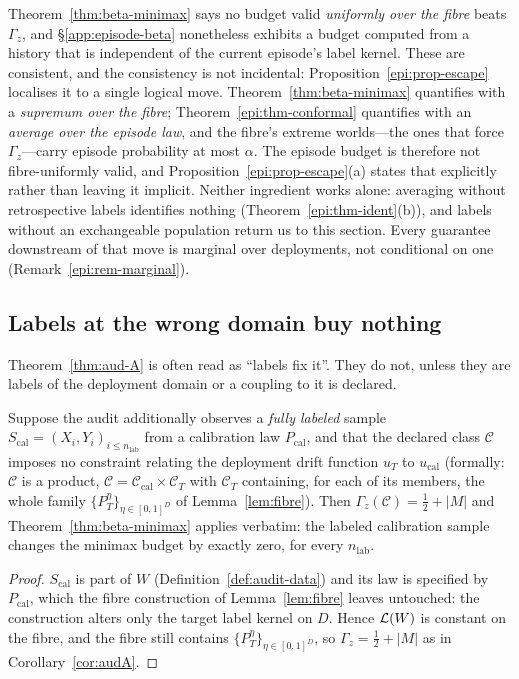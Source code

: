 \begin{remark}\label{rem:seam}
Theorem~\ref{thm:beta-minimax} says no budget valid \emph{uniformly over the fibre} beats
$\Gamma_z$, and \S\ref{app:episode-beta} nonetheless exhibits a budget computed from a history that
is independent of the current episode's label kernel. These are consistent, and the consistency is
not incidental: Proposition~\ref{epi:prop-escape} localises it to a single logical move.
Theorem~\ref{thm:beta-minimax} quantifies with a \emph{supremum over the fibre};
Theorem~\ref{epi:thm-conformal} quantifies with an \emph{average over the episode law}, and the
fibre's extreme worlds---the ones that force $\Gamma_z$---carry episode probability at most
$\alpha$. The episode budget is therefore not fibre-uniformly valid, and
Proposition~\ref{epi:prop-escape}(a) states that explicitly rather than leaving it implicit. Neither
ingredient works alone: averaging without retrospective labels identifies nothing
(Theorem~\ref{epi:thm-ident}(b)), and labels without an exchangeable population return us to this
section. Every guarantee downstream of that move is marginal over deployments, not conditional on
one (Remark~\ref{epi:rem-marginal}).
\end{remark}

\subsection{Labels at the wrong domain buy nothing}

Theorem~\ref{thm:aud-A} is often read as ``labels fix it''. They do not, unless they are
labels of the deployment domain or a coupling to it is declared.

\begin{theorem}\label{thm:anchor}
Suppose the audit additionally observes a \emph{fully labeled} sample
$S_{\mathrm{cal}}=(X_i,Y_i)_{i\le n_{\mathrm{lab}}}$ from a calibration law
$P_{\mathrm{cal}}$, and that the declared class $\mathcal C$ imposes no constraint relating
the deployment drift function $u_T$ to $u_{\mathrm{cal}}$ (formally: $\mathcal C$ is a product,
$\mathcal C=\mathcal C_{\mathrm{cal}}\times\mathcal C_T$ with $\mathcal C_T$ containing, for
each of its members, the whole family $\{P_T^\eta\}_{\eta\in[0,1]^D}$ of
Lemma~\ref{lem:fibre}). Then $\Gamma_z(\mathcal C)=\tfrac12+|M|$ and
Theorem~\ref{thm:beta-minimax} applies verbatim: the labeled calibration sample changes the
minimax budget by exactly zero, for every $n_{\mathrm{lab}}$.
\end{theorem}
\begin{proof}
$S_{\mathrm{cal}}$ is part of $W$ (Definition~\ref{def:audit-data}) and its law is specified
by $P_{\mathrm{cal}}$, which the fibre construction of Lemma~\ref{lem:fibre} leaves
untouched: the construction alters only the target label kernel on $D$. Hence
$\mathcal{L}(W)$ is constant on the fibre, and the fibre still contains
$\{P_T^\eta\}_{\eta\in[0,1]^D}$, so $\Gamma_z=\tfrac12+|M|$ as in
Corollary~\ref{cor:audA}.
\end{proof}

